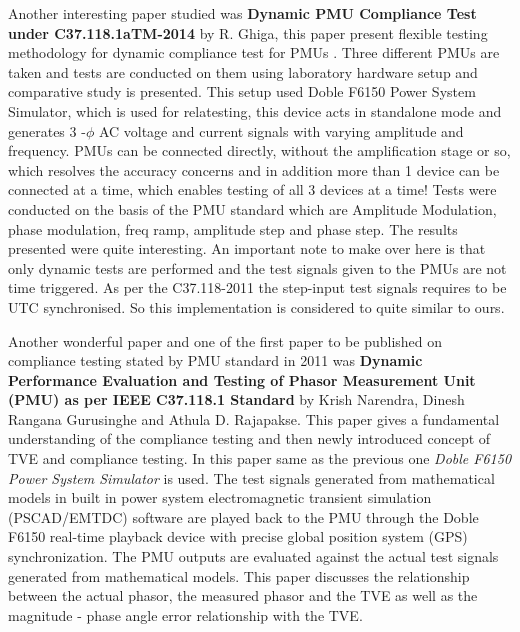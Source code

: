 Another interesting paper studied was \textbf{Dynamic PMU Compliance Test under C37.118.1aTM-2014} by R. Ghiga, this paper present flexible testing methodology for dynamic compliance test for PMUs \cite{Paper:ghiga}. Three different PMUs are taken and tests are conducted on them using laboratory hardware setup and comparative study is presented. This setup used Doble F6150 Power System Simulator, which is used for relatesting, this device acts in standalone mode and generates 3 -$\phi$ AC voltage and current signals with varying amplitude and frequency. PMUs can be connected directly, without the amplification stage or so, which resolves the accuracy concerns and in addition more than 1 device can be connected at a time, which enables testing of all 3 devices at a time! Tests were conducted on the basis of the PMU standard which are Amplitude Modulation, phase modulation, freq ramp, amplitude step and phase step. The results presented were quite interesting. An important note to make over here is that only dynamic tests are performed and the test signals given to the PMUs are not time triggered. As per the C37.118-2011 the step-input test signals requires to be UTC synchronised. So this implementation is considered to quite similar to ours.

Another wonderful paper and one of the first paper to be published on compliance testing stated by PMU standard in 2011 was \textbf{Dynamic Performance Evaluation and Testing of Phasor Measurement Unit (PMU) as per IEEE C37.118.1 Standard} by Krish Narendra, Dinesh Rangana Gurusinghe and Athula D. Rajapakse. This paper gives a fundamental understanding of the compliance testing and then newly introduced concept of TVE and compliance testing. In this paper same as the previous one \textit{Doble F6150 Power System Simulator} is used.  The test signals generated from mathematical models in built in power system electromagnetic transient simulation (PSCAD/EMTDC) software are played back to the PMU through the Doble F6150 real-time playback device with precise global position system (GPS) synchronization. The PMU outputs are evaluated against the actual test signals generated from mathematical models. This paper discusses the relationship between the actual phasor, the measured phasor and the TVE as well as the magnitude - phase angle error relationship with the TVE.

